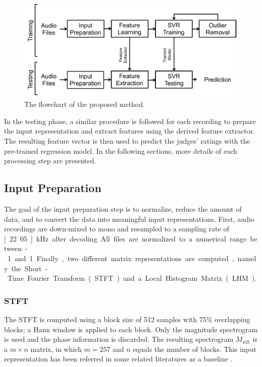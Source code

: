 \documentclass{ws-ijsc}
\begin{document}
\begin{figure}
\centering
\includegraphics[width = \linewidth]{./figs/flowchart.pdf}
\caption{The flowchart of the proposed method.}
\label{fig:flowchart}
\end{figure}

In the testing phase, a similar procedure is followed for each recording to prepare the input representation and extract features using the derived feature extractor. The resulting feature vector is then used to predict the judges' ratings with the pre-trained regression model. In the following sections, more details of each processing step are presented. 

\subsection{Input Preparation}\label{subsec:input}
The goal of the input preparation step is to normalize, reduce the amount of data, and to convert the data into meaningful input representations. First, audio recordings are down-mixed to mono and resampled to a sampling rate of \unit[22.05]{kHz} after decoding. All files are normalized to a numerical range between -1 and 1. Finally, two different matrix representations are computed, namely the Short-Time Fourier Transform (STFT) and a Local Histogram Matrix (LHM). 

\subsubsection{STFT}\label{subsec:stft}
The STFT is computed using a block size of 512 samples with 75\% overlapping blocks; a Hann window is applied to each block. Only the magnitude spectrogram is used and the phase information is discarded. The resulting spectrogram $M_\mathrm{stft}$ is a $m \times n$ matrix, in which $m = 257$ and $n$ equals the number of blocks. This input representation has been referred in some related literatures as a baseline \cite{Su2014Guitar,Su2014Violin}. %
\end{document}
